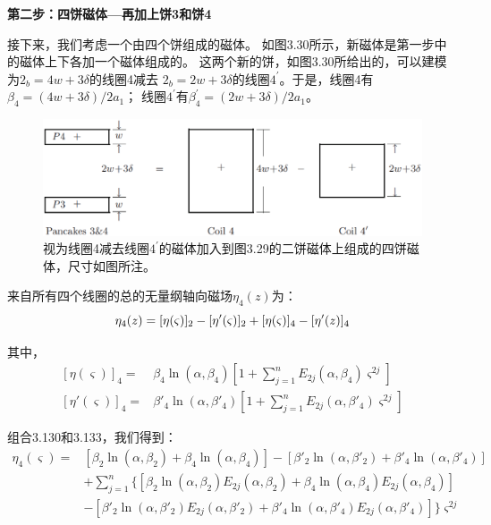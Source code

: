 \textbf{第二步：四饼磁体---再加上饼3和饼4}

接下来，我们考虑一个由四个饼组成的磁体。
如图3.30所示，新磁体是第一步中的磁体上下各加一个磁体组成的。
这两个新的饼，如图3.30所给出的，可以建模为$2_b=4w+3\delta$的线圈4减去
$2_b=2w+3\delta$的线圈$4^\prime$。于是，线圈4有$\beta_4=(4w+3\delta)/2a_1$；
线圈$4^\prime$有$\beta_4^\prime=(2w+3\delta)/2a_1$。
\begin{figure}[htbp]
	\centering
	\includegraphics[scale=0.4]{chpt3/figs/fig3.30.eps}
	\caption{视为线圈4减去线圈$4^\prime$的磁体加入到图3.29的二饼磁体上组成的四饼磁体，尺寸如图所注。}
\end{figure}

来自所有四个线圈的总的无量纲轴向磁场$\eta_4(z)$为：
\begin{equation}
\eta_{4}(z)=[\eta(\varsigma)]_{2}-[\eta'(\varsigma)]_{2}+[\eta(\varsigma)]_{4}-[\eta'(z)]_{4}\\%
\end{equation}

其中，
\begin{subequations}
	\begin{align}
{[\eta(\varsigma)]}_{4}=&\beta_{4}\ln(\alpha,\beta_{4})[1+\sum_{j=1}^{n}E_{2j}(\alpha,\beta_{4})\varsigma^{2j}]\\
{[\eta'(\varsigma)]}_{4}=&\beta'_{4}\ln(\alpha,\beta'_{4})[1+\sum_{j=1}^{n}E_{2j}(\alpha,\beta'_{4})\varsigma^{2j}]
	\end{align}
\end{subequations}

组合3.130和3.133，我们得到：
\begin{equation}
\begin{split}
\eta_{4}(\varsigma)=&[\beta_{2}\ln(\alpha,\beta_{2})+\beta_{4}\ln(\alpha,\beta_{4})]-[\beta'_{2}\ln(\alpha,\beta'_{2})+\beta'_{4}\ln(\alpha,\beta'_{4})]\\
&+\sum_{j=1}^{n}\{[\beta_{2}\ln(\alpha,\beta_{2})E_{2j}(\alpha,\beta_{2})+\beta_{4}\ln(\alpha,\beta_{4})E_{2j}(\alpha,\beta_{4})]\\
&-[\beta'_{2}\ln(\alpha,\beta'_{2})E_{2j}(\alpha,\beta'_{2})+\beta'_{4}\ln(\alpha,\beta'_{4})E_{2j}(\alpha,\beta'_{4})]\}\varsigma^{2j}%
\end{split}
\end{equation}

